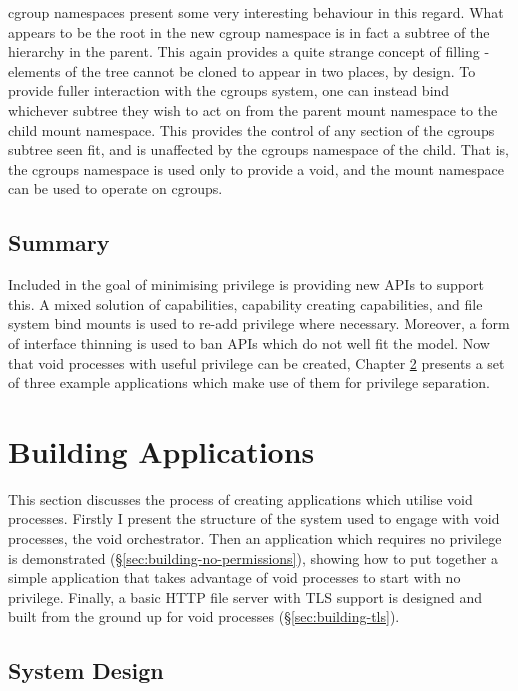 \documentclass[12pt,a4paper,twoside]{report}
\begin{document}
cgroup namespaces present some very interesting behaviour in this regard. What appears to be the root in the new cgroup namespace is in fact a subtree of the hierarchy in the parent. This again provides a quite strange concept of filling - elements of the tree cannot be cloned to appear in two places, by design. To provide fuller interaction with the cgroups system, one can instead bind whichever subtree they wish to act on from the parent mount namespace to the child mount namespace. This provides the control of any section of the cgroups subtree seen fit, and is unaffected by the cgroups namespace of the child. That is, the cgroups namespace is used only to provide a void, and the mount namespace can be used to operate on cgroups.

\section{Summary}

Included in the goal of minimising privilege is providing new APIs to support this. A mixed solution of capabilities, capability creating capabilities, and file system bind mounts is used to re-add privilege where necessary. Moreover, a form of interface thinning is used to ban APIs which do not well fit the model. Now that void processes with useful privilege can be created, Chapter \ref{chap:building-apps} presents a set of three example applications which make use of them for privilege separation.


\chapter{Building Applications}
\label{chap:building-apps}

This section discusses the process of creating applications which utilise void processes. Firstly I present the structure of the system used to engage with void processes, the void orchestrator. Then an application which requires no privilege is demonstrated (§\ref{sec:building-no-permissions}), showing how to put together a simple application that takes advantage of void processes to start with no privilege. Finally, a basic HTTP file server with TLS support is designed and built from the ground up for void processes (§\ref{sec:building-tls}).

\section{System Design}
\label{sec:system-design}
\end{document}
